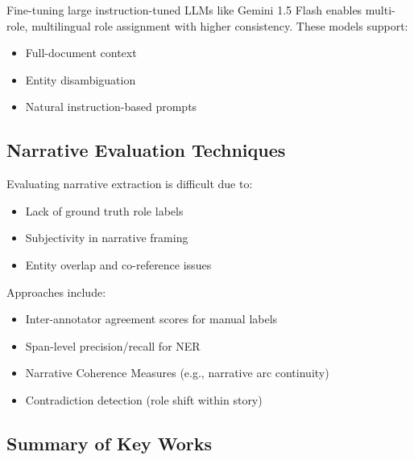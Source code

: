 \documentclass[12pt]{article}
\begin{document}
Fine-tuning large instruction-tuned LLMs like Gemini 1.5 Flash enables multi-role, multilingual role assignment with higher consistency. These models support:
\begin{itemize}
    \item Full-document context
    \item Entity disambiguation
    \item Natural instruction-based prompts
\end{itemize}

\subsection{Narrative Evaluation Techniques}

Evaluating narrative extraction is difficult due to:
\begin{itemize}
    \item Lack of ground truth role labels
    \item Subjectivity in narrative framing
    \item Entity overlap and co-reference issues
\end{itemize}

Approaches include:
\begin{itemize}
    \item Inter-annotator agreement scores for manual labels
    \item Span-level precision/recall for NER
    \item Narrative Coherence Measures (e.g., narrative arc continuity)
    \item Contradiction detection (role shift within story)
\end{itemize}

\subsection{Summary of Key Works}
\end{document}
